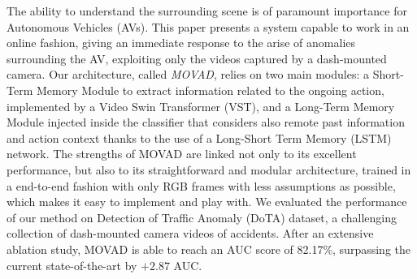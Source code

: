 The ability to understand the surrounding scene is of paramount importance for Autonomous Vehicles (AVs).
This paper presents a system capable to work in an online fashion, giving an immediate response to the arise of anomalies surrounding the AV, exploiting only the videos captured by a dash-mounted camera.
Our architecture, called \emph{MOVAD}, relies on two main modules: a Short-Term Memory Module to extract information related to the ongoing action, implemented by a Video Swin Transformer (VST), and a Long-Term Memory Module injected inside the classifier that considers also remote past information and action context thanks to the use of a Long-Short Term Memory (LSTM) network. 
The strengths of MOVAD are linked not only to its excellent performance, but also to its straightforward and modular architecture, trained in a end-to-end fashion with only RGB frames with less assumptions as possible, which makes it easy to implement and play with.
We evaluated the performance of our method on Detection of Traffic Anomaly (DoTA) dataset, a challenging collection of dash-mounted camera videos of accidents.
After an extensive ablation study, MOVAD is able to reach an AUC score of 82.17\%, surpassing the current state-of-the-art by $+2.87$ AUC.